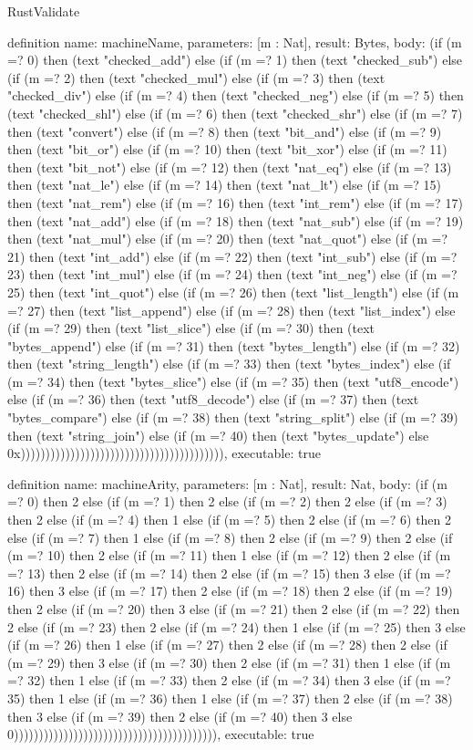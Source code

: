 \begin{lexlean}{RustValidate}
\begin{semanticmodule}
definition{
  name: machineName,
  parameters: [m : Nat],
  result: Bytes,
  body: (if (m =? 0) then (text "checked_add") else (if (m =? 1) then (text "checked_sub") else (if (m =? 2) then (text "checked_mul") else (if (m =? 3) then (text "checked_div") else (if (m =? 4) then (text "checked_neg") else (if (m =? 5) then (text "checked_shl") else (if (m =? 6) then (text "checked_shr") else (if (m =? 7) then (text "convert") else (if (m =? 8) then (text "bit_and") else (if (m =? 9) then (text "bit_or") else (if (m =? 10) then (text "bit_xor") else (if (m =? 11) then (text "bit_not") else (if (m =? 12) then (text "nat_eq") else (if (m =? 13) then (text "nat_le") else (if (m =? 14) then (text "nat_lt") else (if (m =? 15) then (text "nat_rem") else (if (m =? 16) then (text "int_rem") else (if (m =? 17) then (text "nat_add") else (if (m =? 18) then (text "nat_sub") else (if (m =? 19) then (text "nat_mul") else (if (m =? 20) then (text "nat_quot") else (if (m =? 21) then (text "int_add") else (if (m =? 22) then (text "int_sub") else (if (m =? 23) then (text "int_mul") else (if (m =? 24) then (text "int_neg") else (if (m =? 25) then (text "int_quot") else (if (m =? 26) then (text "list_length") else (if (m =? 27) then (text "list_append") else (if (m =? 28) then (text "list_index") else (if (m =? 29) then (text "list_slice") else (if (m =? 30) then (text "bytes_append") else (if (m =? 31) then (text "bytes_length") else (if (m =? 32) then (text "string_length") else (if (m =? 33) then (text "bytes_index") else (if (m =? 34) then (text "bytes_slice") else (if (m =? 35) then (text "utf8_encode") else (if (m =? 36) then (text "utf8_decode") else (if (m =? 37) then (text "bytes_compare") else (if (m =? 38) then (text "string_split") else (if (m =? 39) then (text "string_join") else (if (m =? 40) then (text "bytes_update") else 0x))))))))))))))))))))))))))))))))))))))))),
  executable: true
}

definition{
  name: machineArity,
  parameters: [m : Nat],
  result: Nat,
  body: (if (m =? 0) then 2 else (if (m =? 1) then 2 else (if (m =? 2) then 2 else (if (m =? 3) then 2 else (if (m =? 4) then 1 else (if (m =? 5) then 2 else (if (m =? 6) then 2 else (if (m =? 7) then 1 else (if (m =? 8) then 2 else (if (m =? 9) then 2 else (if (m =? 10) then 2 else (if (m =? 11) then 1 else (if (m =? 12) then 2 else (if (m =? 13) then 2 else (if (m =? 14) then 2 else (if (m =? 15) then 3 else (if (m =? 16) then 3 else (if (m =? 17) then 2 else (if (m =? 18) then 2 else (if (m =? 19) then 2 else (if (m =? 20) then 3 else (if (m =? 21) then 2 else (if (m =? 22) then 2 else (if (m =? 23) then 2 else (if (m =? 24) then 1 else (if (m =? 25) then 3 else (if (m =? 26) then 1 else (if (m =? 27) then 2 else (if (m =? 28) then 2 else (if (m =? 29) then 3 else (if (m =? 30) then 2 else (if (m =? 31) then 1 else (if (m =? 32) then 1 else (if (m =? 33) then 2 else (if (m =? 34) then 3 else (if (m =? 35) then 1 else (if (m =? 36) then 1 else (if (m =? 37) then 2 else (if (m =? 38) then 3 else (if (m =? 39) then 2 else (if (m =? 40) then 3 else 0))))))))))))))))))))))))))))))))))))))))),
  executable: true
}


\end{semanticmodule}
\end{lexlean}
